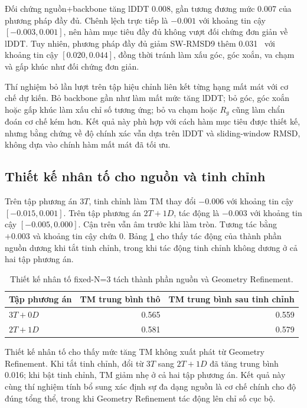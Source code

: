 \documentclass[12pt,a4paper,oneside]{report}
\newcommand{\angstrom}{\text{\AA}}
\begin{document}
Đối chứng nguồn+backbone tăng lDDT 0.008, gần tương đương mức 0.007 của phương pháp đầy đủ.
Chênh lệch trực tiếp là $-0.001$ với khoảng tin cậy $[-0.003,0.001]$, nên hàm mục tiêu đầy đủ
không vượt đối chứng đơn giản về lDDT. Tuy nhiên, phương pháp đầy đủ giảm SW-RMSD9 thêm
0.031~\angstrom{} với khoảng tin cậy $[0.020,0.044]$, đồng thời tránh làm xấu góc, góc
xoắn, va chạm và gấp khúc như đối chứng đơn giản.

Thí nghiệm bỏ lần lượt trên tập hiệu chỉnh liên kết từng hạng mất mát với cơ chế dự kiến.
Bỏ backbone gần như làm mất mức tăng lDDT; bỏ góc, góc xoắn hoặc gấp khúc làm xấu chỉ số tương ứng; bỏ
va chạm hoặc $R_g$ cũng làm chẩn đoán cơ chế kém hơn. Kết quả này phù hợp với cách hàm mục tiêu
được thiết kế, nhưng bằng chứng về độ chính xác vẫn dựa trên lDDT và sliding-window RMSD,
không dựa vào chính hàm mất mát đã tối ưu.

\subsection{Thiết kế nhân tố cho nguồn và tinh chỉnh}

Trên tập phương án $3T$, tinh chỉnh làm TM thay đổi $-0.006$ với khoảng tin cậy
$[-0.015,0.001]$. Trên tập phương án $2T+1D$, tác động là $-0.003$ với khoảng tin cậy
$[-0.005,0.000]$. Cận trên vẫn âm trước khi làm tròn. Tương tác bằng $+0.003$ và khoảng
tin cậy chứa 0. Bảng
\ref{tab:factorial_vi} cho thấy tác động của thành phần nguồn dương khi tắt tinh chỉnh,
trong khi tác động tinh chỉnh không dương ở cả hai tập phương án.

\begin{table}[H]
\centering
\caption{Thiết kế nhân tố fixed-N=3 tách thành phần nguồn và Geometry Refinement.}
\label{tab:factorial_vi}
\begin{tabular}{lrr}
\toprule
Tập phương án & TM trung bình thô & TM trung bình sau tinh chỉnh \\
\midrule
$3T+0D$ & 0.565 & 0.559 \\
$2T+1D$ & 0.581 & 0.579 \\
\bottomrule
\end{tabular}
\end{table}

Thiết kế nhân tố cho thấy mức tăng TM không xuất phát từ Geometry Refinement. Khi tắt tinh chỉnh,
đổi từ $3T$ sang $2T+1D$ đã tăng trung bình 0.016; khi bật tinh chỉnh, TM giảm nhẹ ở cả
hai tập phương án. Kết quả này cùng thí nghiệm tính bổ sung xác định sự đa dạng nguồn là cơ chế
chính cho độ đúng tổng thể, trong khi Geometry Refinement tác động lên chỉ số cục bộ.
\end{document}
